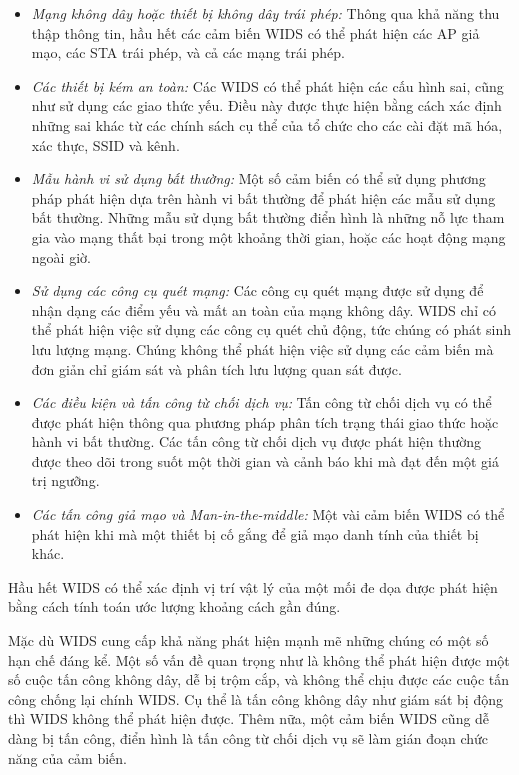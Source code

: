 \begin{itemize}
\item \emph{Mạng không dây hoặc thiết bị không dây trái phép:} \tab Thông qua khả năng thu thập thông tin, hầu hết các cảm biến WIDS có thể phát hiện các AP giả mạo, các STA trái phép, và cả các mạng trái phép.

\item \emph{Các thiết bị kém an toàn:} \tab Các WIDS có thể phát hiện các cấu hình sai, cũng như sử dụng các giao thức yếu. Điều này được thực hiện bằng cách xác định những sai khác từ các chính sách cụ thể của tổ chức cho các cài đặt mã hóa, xác thực, SSID và kênh.

\item \emph{Mẫu hành vi sử dụng bất thường:} \tab Một số cảm biến có thể sử dụng phương pháp phát hiện dựa trên hành vi bất thường để phát hiện các mẫu sử dụng bất thường. Những mẫu sử dụng bất thường điển hình là những nỗ lực tham gia vào mạng thất bại trong một khoảng thời gian, hoặc các hoạt động mạng ngoài giờ.

\item \emph{Sử dụng các công cụ quét mạng:} \tab Các công cụ quét mạng được sử dụng để nhận dạng các điểm yếu và mất an toàn của mạng không dây. WIDS chỉ có thể phát hiện việc sử dụng các công cụ quét chủ động, tức chúng có phát sinh lưu lượng mạng. Chúng không thể phát hiện việc sử dụng các cảm biến mà đơn giản chỉ giám sát và phân tích lưu lượng quan sát được.

\item \emph{Các điều kiện và tấn công từ chối dịch vụ:} \tab Tấn công từ chối dịch vụ có thể được phát hiện thông qua phương pháp phân tích trạng thái giao thức hoặc hành vi bất thường. Các tấn công từ chối dịch vụ được phát hiện thường được theo dõi trong suốt một thời gian và cảnh báo khi mà đạt đến một giá trị ngưỡng.

\item \emph{Các tấn công giả mạo và Man-in-the-middle:} \tab Một vài cảm biến WIDS có thể phát hiện khi mà một thiết bị cố gắng để giả mạo danh tính của thiết bị khác.
\end{itemize}

Hầu hết WIDS có thể xác định vị trí vật lý của một mối đe dọa được phát hiện bằng cách tính toán ước lượng khoảng cách gần đúng.

Mặc dù WIDS cung cấp khả năng phát hiện mạnh mẽ những chúng có một số hạn chế đáng kể. Một số vấn đề quan trọng như là không thể phát hiện được một số cuộc tấn công không dây, dễ bị trộm cắp, và không thể chịu được các cuộc tấn công chống lại chính WIDS. Cụ thể là tấn công không dây như giám sát bị động thì WIDS không thể phát hiện được. Thêm nữa, một cảm biến WIDS cũng dễ dàng bị tấn công, điển hình là tấn công từ chối dịch vụ sẽ làm gián đoạn chức năng của cảm biến.

